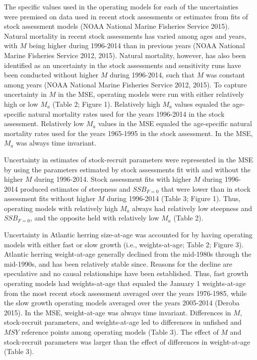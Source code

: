 \documentclass[]{article}
\begin{document}
The specific values used in the operating models for each of the
uncertainties were premised on data used in recent stock assessments or
estimates from fits of stock assessment models (NOAA National Marine
Fisheries Service 2015). Natural mortality in recent stock assessments
has varied among ages and years, with \(M\) being higher during
1996-2014 than in previous years (NOAA National Marine Fisheries Service
2012, 2015). Natural mortality, however, has also been identified as an
uncertainty in the stock assessments and sensitivity runs have been
conducted without higher \(M\) during 1996-2014, such that \(M\) was
constant among years (NOAA National Marine Fisheries Service 2012,
2015). To capture uncertainty in \(M\) in the MSE, operating models were
run with either relatively high or low \(M_a\) (Table 2; Figure 1).
Relatively high \(M_a\) values equaled the age-specific natural
mortality rates used for the years 1996-2014 in the stock assessment.
Relatively low \(M_a\) values in the MSE equaled the age-specific
natural mortality rates used for the years 1965-1995 in the stock
assessment. In the MSE, \(M_a\) was always time invariant.

Uncertainty in estimates of stock-recruit parameters were represented in
the MSE by using the parameters estimated by stock assessments fit with
and without the higher \(M\) during 1996-2014. Stock assessment fits
with higher \(M\) during 1996-2014 produced estimates of steepness and
\(SSB_{F=0}\) that were lower than in stock assessment fits without
higher \(M\) during 1996-2014 (Table 3; Figure 1). Thus, operating
models with relatively high \(M_a\) always had relatively low steepness
and \(SSB_{F=0}\), and the opposite held with relatively low \(M_a\)
(Table 2).

Uncertainty in Atlantic herring size-at-age was accounted for by having
operating models with either fast or slow growth (i.e., weights-at-age;
Table 2; Figure 3). Atlantic herring weight-at-age generally declined
from the mid-1980s through the mid-1990s, and has been relatively stable
since. Reasons for the decline are speculative and no causal
relationships have been established. Thus, fast growth operating models
had weights-at-age that equaled the January 1 weights-at-age from the
most recent stock assessment averaged over the years 1976-1985, while
the slow growth operating models averaged over the years 2005-2014
(Deroba 2015). In the MSE, weight-at-age was always time invariant.
Differences in \(M\), stock-recruit parameters, and weights-at-age led
to differences in unfished and \(MSY\) reference points among operating
models (Table 3). The effect of \(M\) and stock-recruit parameters was
larger than the effect of differences in weight-at-age (Table 3).
\end{document}
